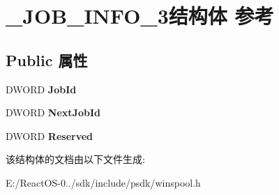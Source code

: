 \hypertarget{struct___j_o_b___i_n_f_o__3}{}\section{\+\_\+\+J\+O\+B\+\_\+\+I\+N\+F\+O\+\_\+3结构体 参考}
\label{struct___j_o_b___i_n_f_o__3}
\subsection*{Public 属性}
\begin{DoxyCompactItemize}
\item 
\mbox{\label{struct___j_o_b___i_n_f_o__3_a268f4e560a59f32a0df17e97385d5e4c}} 
D\+W\+O\+RD {\bfseries Job\+Id}
\item 
\mbox{\label{struct___j_o_b___i_n_f_o__3_ab2369d9e7b5afb4d1db562bafb87c554}} 
D\+W\+O\+RD {\bfseries Next\+Job\+Id}
\item 
\mbox{\label{struct___j_o_b___i_n_f_o__3_aba11ea9c8da7539d77d744f15e4670bd}} 
D\+W\+O\+RD {\bfseries Reserved}
\end{DoxyCompactItemize}


该结构体的文档由以下文件生成\+:\begin{DoxyCompactItemize}
\item 
E\+:/\+React\+O\+S-\/0../sdk/include/psdk/winspool.\+h\end{DoxyCompactItemize}
